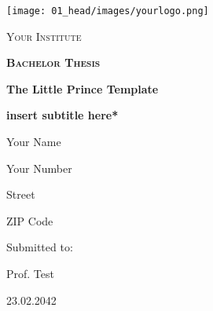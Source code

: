 
\begin{titlepage}
  \centering
  \texttt{[image: 01\_head/images/yourlogo.png]}\par\vspace{1cm}
  \linespread{1}\Large{\scshape Your Institute\par}
  \vspace{1.5cm}
  {\scshape\Large\bfseries Bachelor Thesis\par}
  {\huge\bfseries The Little Prince Template \par
    \Large\bfseries *insert subtitle here*\par}
  \vspace{1.5cm}
  \linespread{0.75}\Large{Your Name\par Your Number\par Street\par ZIP Code}
  \vfill
  \linespread{0.75}\large{Submitted to:\par
    Prof. Test}
  \vfill
  {\large 23.02.2042\par}
\end{titlepage}
